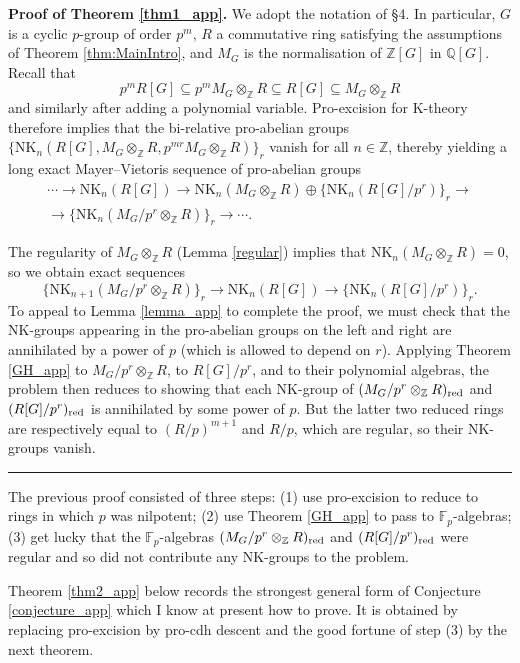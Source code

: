 \documentclass[reqno,11pt,letterpaper]{amsart}
\theoremstyle{plain}
\numberwithin{equation}{subsection}
\theoremstyle{remark}
\theoremstyle{plain}
\theoremstyle{definition}\newtheorem*{notation}{Notation}
\newcommand{\bbF}{{\mathbb F}}
\newcommand{\bbZ}{{\mathbb Z}}
\newcommand{\Q}{{\mathbb Q}}
\newcommand{\To}{\longrightarrow}
\newenvironment{proof}[1][Proof]{\noindent\textbf{#1.} }{\ \rule{0.5em}{0.5em}}
\newcommand{\RK}{\mathrm{K}}
\newcommand{\NK}{\mathrm{NK}}
\newcommand{\BZ}{\mathbb{Z}}
\begin{document}
\begin{proof}[Proof of Theorem \ref{thm1_app}]
We adopt the notation of \S4. In particular, $G$ is a cyclic $p$-group of order $p^m$, $R$ a commutative ring satisfying the assumptions of Theorem \ref{thm:MainIntro}, and $M_G$ is the normalisation of $\BZ[G]$ in $\Q[G]$. Recall that
 \[
 p^m R[G]\subseteq p^mM_G\otimes_\bbZ R\subseteq R[G]\subseteq M_G\otimes_\bbZ R
 \]
  and similarly after adding a polynomial variable. Pro-excision for $\RK$-theory \cite[Corol.~0.4]{Morrowpro2} therefore implies that the bi-relative pro-abelian groups $\{\NK_n(R[G],M_G\otimes_\bbZ R, p^{mr}M_G\otimes_\bbZ R)\}_r$ vanish for all $n\in\BZ$, thereby yielding a long exact Mayer--Vietoris sequence of pro-abelian groups 
  \begin{multline}
  \cdots\to \NK_n(R[G])\to \NK_n(M_G\otimes_\bbZ R)\oplus \{\NK_n(R[G]/p^{r})\}_r\to\\ \to \{\NK_n(M_G/p^{r}\otimes_\bbZ R)\}_r\to\cdots. 
  \end{multline}

The regularity of $M_G\otimes_\BZ R$ (Lemma \ref{regular}) implies that $\NK_n(M_G\otimes_\BZ R)=0$, so we obtain exact sequences
 \[
 \{\NK_{n+1}(M_G/p^{r}\otimes_\BZ R)\}_r\To \NK_n(R[G])\To \{\NK_n(R[G]/p^{r})\}_r.
\]
 To appeal to Lemma \ref{lemma_app} to complete the proof, we must check that the NK-groups appearing in the pro-abelian groups on the left and right are annihilated by a power of $p$ (which is allowed to depend on $r$). Applying Theorem \ref{GH_app} to $M_G/p^r\otimes_\bbZ R$, to $R[G]/p^r$, and to their polynomial algebras, the problem then reduces to showing that each $\NK$-group of $(M_G/p^r\otimes_\bbZ R)_{\rm red}$ and $(R[G]/p^r)_{\rm red}$ is annihilated by some power of $p$. But the latter two reduced rings are respectively equal to $(R/p)^{m+1}$ and $R/p$, which are regular, so their NK-groups vanish.
\end{proof}

The previous proof consisted of three steps: (1) use pro-excision to reduce to rings in which $p$ was nilpotent; (2) use Theorem \ref{GH_app} to pass to $\bbF_p$-algebras; (3) get lucky that the $\bbF_p$-algebras $(M_G/p^r\otimes_\bbZ R)_{\rm red}$ and $(R[G]/p^r)_{\rm red}$ were regular and so did not contribute any NK-groups to the problem.

Theorem \ref{thm2_app} below records the strongest general form of Conjecture \ref{conjecture_app} which I know at present how to prove. It is obtained by replacing pro-excision by pro-cdh descent and the good fortune of step (3) by the next theorem.
\end{document}

